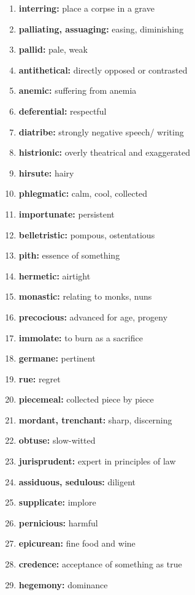 \documentclass{article}
\begin{document}
\begin{enumerate}
    \item \textbf{interring: }{place a corpse in a grave}
    \item \textbf{palliating, assuaging: }{easing, diminishing}
    \item \textbf{pallid: }{pale, weak}
    \item \textbf{antithetical: }{directly opposed or contrasted}
    \item \textbf{anemic: }{suffering from anemia}
    \item \textbf{deferential: }{respectful}
    \item \textbf{diatribe: }{strongly negative speech/ writing}
    \item \textbf{histrionic: }{overly theatrical and exaggerated}
    \item \textbf{hirsute: }{hairy}
    \item \textbf{phlegmatic: }{calm, cool, collected}
    \item \textbf{importunate: }{persistent}
    \item \textbf{belletristic: }{pompous, ostentatious}
    \item \textbf{pith: }{essence of something}
    \item \textbf{hermetic: }{airtight}
    \item \textbf{monastic: }{relating to monks, nuns}
    \item \textbf{precocious: }{advanced for age, progeny}
    \item \textbf{immolate: }{to burn as a sacrifice}
    \item \textbf{germane: }{pertinent}
    \item \textbf{rue: }{regret}
    \item \textbf{piecemeal: }{collected piece by piece}
    \item \textbf{mordant, trenchant: }{sharp, discerning}
    \item \textbf{obtuse: }{slow-witted}
    \item \textbf{jurisprudent: }{expert in principles of law}
    \item \textbf{assiduous, sedulous: }{diligent}
    \item \textbf{supplicate: }{implore}
    \item \textbf{pernicious: }{harmful}
    \item \textbf{epicurean: }{fine food and wine}
    \item \textbf{credence: }{acceptance of something as true}
    \item \textbf{hegemony: }{dominance}

\end{enumerate}
\end{document}
